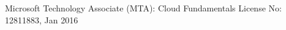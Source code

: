 \vspace{-2mm}
\begin{cventries}
  \cventry
    {}
    {Microsoft Technology Associate (MTA): Cloud Fundamentals}
    {License No: 12811883, Jan 2016}
    {}
    {}
\end{cventries}
\vspace{-5mm}